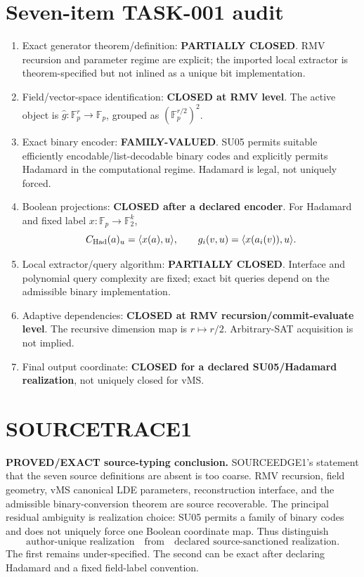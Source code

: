 \documentclass[11pt]{article}
\begin{document}
\section*{Seven-item TASK-001 audit}
\begin{enumerate}
\item Exact generator theorem/definition: \textbf{PARTIALLY CLOSED}. RMV recursion and parameter regime are explicit; the imported local extractor is theorem-specified but not inlined as a unique bit implementation.
\item Field/vector-space identification: \textbf{CLOSED at RMV level}. The active object is $\widehat g:\mathbb F_p^r\to\mathbb F_p$, grouped as $(\mathbb F_p^{r/2})^2$.
\item Exact binary encoder: \textbf{FAMILY-VALUED}. SU05 permits suitable efficiently encodable/list-decodable binary codes and explicitly permits Hadamard in the computational regime. Hadamard is legal, not uniquely forced.
\item Boolean projections: \textbf{CLOSED after a declared encoder}. For Hadamard and fixed label $x:\mathbb F_p\to\mathbb F_2^k$,
\[
C_{\rm Had}(a)_u=\langle x(a),u\rangle,\qquad
g_i(v,u)=\langle x(a_i(v)),u\rangle.
\]
\item Local extractor/query algorithm: \textbf{PARTIALLY CLOSED}. Interface and polynomial query complexity are fixed; exact bit queries depend on the admissible binary implementation.
\item Adaptive dependencies: \textbf{CLOSED at RMV recursion/commit-evaluate level}. The recursive dimension map is $r\mapsto r/2$. Arbitrary-SAT acquisition is not implied.
\item Final output coordinate: \textbf{CLOSED for a declared SU05/Hadamard realization}, not uniquely closed for vMS.
\end{enumerate}
\section*{SOURCETRACE1}
\textbf{PROVED/EXACT source-typing conclusion.}
SOURCEEDGE1's statement that the seven source definitions are absent is too coarse. RMV recursion, field geometry, vMS canonical LDE parameters, reconstruction interface, and the admissible binary-conversion theorem are source recoverable. The principal residual ambiguity is realization choice: SU05 permits a family of binary codes and does not uniquely force one Boolean coordinate map.
Thus distinguish
\[
\text{author-unique realization}\quad\text{from}\quad
\text{declared source-sanctioned realization}.
\]
The first remains under-specified. The second can be exact after declaring Hadamard and a fixed field-label convention.
\end{document}
